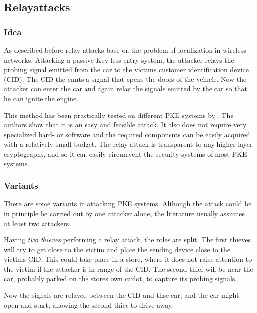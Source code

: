 
\subsection{Relayattacks}
\label{sec:relayAttacks}
\subsubsection*{Idea}

	As described before relay attacks base on the problem of localization in
	wireless networks.
	Attacking a passive Key-less entry system,
	the attacker relays the probing signal emitted from the car to the victims
	customer identification device (CID).
	The CID the emits a signal that opens the doors of the vehicle.
	Now the attacker can enter the car and again relay the signals emitted by the
	car so that he can ignite the engine.
	
	This method has been practically tested on different PKE systems by \cite{relayAttacksFranc}. %
	The authors show that it is an easy and feasible attack.
	It also does not require very specialized hard- or software and
	the required components can be easily acquired with a relatively small budget.
	The relay attack is transparent to any higher layer cryptography,	%
	and so it can easily circumvent the security systems of most PKE systems.

\subsubsection*{Variants}
	There are some variants in attacking PKE systems.
	Although the attack could be in principle be carried out by one attacker alone,
	the literature usually assumes at least two attackers.

	\label{par:twoThieves}
	Having \textsl{two thieves} performing a relay attack,
	the roles are split.
	The first thieves will try to get close to the victim and place
	the sending device close to the victims CID.
	This could take place in a store,
	where it does not raise attention to the victim if the attacker
	is in range of the CID.
	The second thief will be near the car,
	probably parked on the stores own carlot,
	to capture its probing signals.

	Now the signals are relayed between the CID and thse car,
	and the car might open and start,
	allowing the second thiee to drive away.
	
